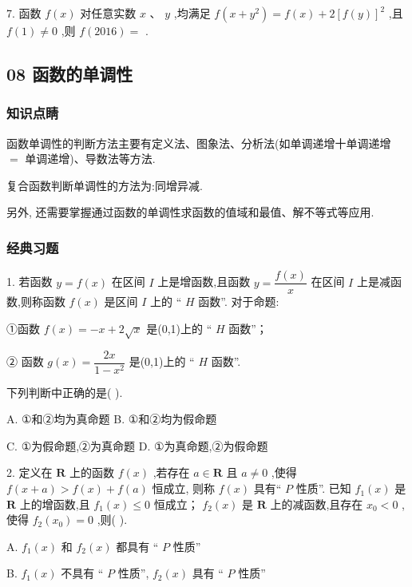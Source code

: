 7. 函数 $f\left( x\right)$ 对任意实数 $x\text{ 、 }y$ ,均满足 $f\left( {x + {y}^{2}}\right)  = f\left( x\right)  + 2{\left\lbrack  f\left( y\right) \right\rbrack  }^{2}$ ,且 $f\left( 1\right)  \neq  0$ ,则 $f\left( {2016}\right)  =$ \blkda{}.


\subsection*{08 函数的单调性}

\subsubsection*{知识点睛}

函数单调性的判断方法主要有定义法、图象法、分析法(如单调递增十单调递增 $=$ 单调递增)、导数法等方法.

复合函数判断单调性的方法为:同增异减.

另外, 还需要掌握通过函数的单调性求函数的值域和最值、解不等式等应用.

\subsubsection*{经典习题}

1. 若函数 $y = f\left( x\right)$ 在区间 $I$ 上是增函数,且函数 $y = \dfrac{f\left( x\right) }{x}$ 在区间 $I$ 上是减函数,则称函数 $f\left( x\right)$ 是区间 $I$ 上的 “ $H$ 函数”. 对于命题:

①函数 $f\left( x\right)  =  - x + 2\sqrt{x}$ 是(0,1)上的 “ $H$ 函数”；

② 函数 $g\left( x\right)  = \dfrac{2x}{1 - {x}^{2}}$ 是(0,1)上的 “ $H$ 函数”.

下列判断中正确的是(   ).

A. ①和②均为真命题 B. ①和②均为假命题

C. ①为假命题,②为真命题 D. ①为真命题,②为假命题

2. 定义在 $\mathbf{R}$ 上的函数 $f\left( x\right)$ ,若存在 $a \in  \mathbf{R}$ 且 $a \neq  0$ ,使得 $f\left( {x + a}\right)  > f\left( x\right)  + f\left( a\right)$ 恒成立, 则称 $f\left( x\right)$ 具有“ $P$ 性质”. 已知 ${f}_{1}\left( x\right)$ 是 $\mathbf{R}$ 上的增函数,且 ${f}_{1}\left( x\right)  \leq  0$ 恒成立； ${f}_{2}\left( x\right)$ 是 $\mathbf{R}$ 上的减函数,且存在 ${x}_{0} < 0$ ,使得 ${f}_{2}\left( {x}_{0}\right)  = 0$ ,则(   ).

A. ${f}_{1}\left( x\right)$ 和 ${f}_{2}\left( x\right)$ 都具有 “ $P$ 性质”

B. ${f}_{1}\left( x\right)$ 不具有 “ $P$ 性质”, ${f}_{2}\left( x\right)$ 具有 “ $P$ 性质”

